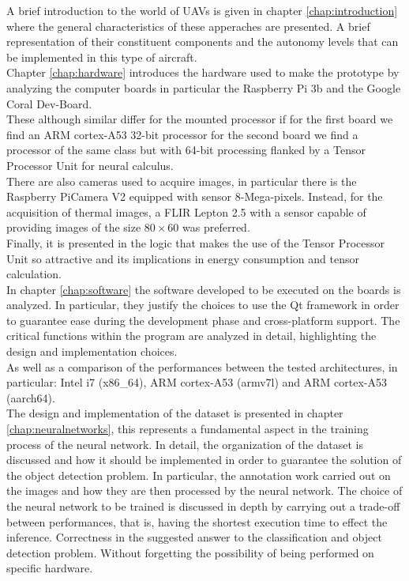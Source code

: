 \noindent 
A brief introduction to the world of UAVs is given in chapter
\ref{chap:introduction} where the general characteristics of these apperaches
are presented. 
A brief representation of their constituent components and the autonomy levels
that can be implemented in this type of aircraft.\\

\noindent Chapter \ref{chap:hardware} introduces the hardware used to make the
prototype by analyzing the computer boards in particular the Raspberry Pi 3b and
the Google Coral Dev-Board.\\
These although similar differ for the mounted processor if for the first board
we find an ARM cortex-A53 32-bit processor for the second board we find a
processor of the same class but with 64-bit processing flanked by a Tensor
Processor Unit for neural calculus.\\
There are also cameras used to acquire images, in particular there is the
Raspberry PiCamera V2 equipped with sensor 8-Mega-pixels. 
Instead, for the acquisition of thermal images, a FLIR Lepton 2.5 with a sensor
capable of providing images of the size $ 80 \times 60 $ was preferred.\\ 
Finally, it is presented in the logic that makes the use of the Tensor Processor
Unit so attractive and its implications in energy consumption and tensor
calculation.\\

\noindent In chapter \ref{chap:software} the software developed to be executed
on the boards is analyzed. 
In particular, they justify the choices to use the Qt framework in
order to guarantee ease during the development phase and cross-platform support.
The critical functions within the program are analyzed in detail, highlighting
the design and implementation choices.\\ 
As well as a comparison of the performances between the tested architectures, in
particular: Intel i7 (x86\_64), ARM cortex-A53 (armv7l) and ARM cortex-A53
(aarch64).\\

\noindent The design and implementation of the dataset is presented in chapter
\ref{chap:neuralnetworks}, this represents a fundamental aspect in the training
process of the neural network.
In detail, the organization of the dataset is discussed and how it should be
implemented in order to guarantee the solution of the object detection problem.
In particular, the annotation work carried out on the images and how they are
then processed by the neural network.
The choice of the neural network to be trained is discussed in depth by carrying
out a trade-off between performances, that is, having the shortest execution
time to effect the inference. 
Correctness in the suggested answer to the classification and object detection
problem. 
Without forgetting the possibility of being performed on specific hardware.\\

